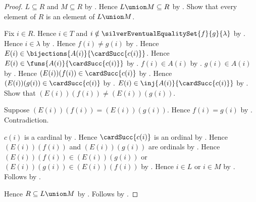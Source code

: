 \begin{proof}
    $L\subseteq R$ and $M\subseteq R$
        by .
    Hence $L\union M\subseteq R$ by .
    Show that every element of $R$ is an element of $L\union M$.
    \begin{subproof}
        Fix $i\in R$.
        Hence $i\in T$ and
            $i\notin\silverEventualEqualitySet{f}{g}{\lambda}$
            by .
        Hence $i\in\lambda$ by .
        Hence $f(i)\neq g(i)$
            by .
        Hence $E(i)\in\bijections{A(i)}{\cardSucc{c(i)}}$.
        Hence $E(i)\in\funs{A(i)}{\cardSucc{c(i)}}$
            by .
        $f(i)\in A(i)$ by .
        $g(i)\in A(i)$ by .
        Hence $(E(i))(f(i))\in\cardSucc{c(i)}$
            by .
        Hence $(E(i))(g(i))\in\cardSucc{c(i)}$
            by .
        $E(i)\in\inj{A(i)}{\cardSucc{c(i)}}$ by
            .
        Show that $(E(i))(f(i))\neq(E(i))(g(i))$.
        \begin{subproof}
            Suppose $(E(i))(f(i))=(E(i))(g(i))$.
            Hence $f(i)=g(i)$ by .
            Contradiction.
        \end{subproof}
        $c(i)$ is a cardinal by .
        Hence $\cardSucc{c(i)}$ is an ordinal
            by .
        Hence $(E(i))(f(i))$ and $(E(i))(g(i))$ are ordinals
            by .
        Hence $(E(i))(f(i))\in(E(i))(g(i))$ or
            $(E(i))(g(i))\in(E(i))(f(i))$
            by .
        Hence $i\in L$ or $i\in M$ by .
        Follows by .
    \end{subproof}
    Hence $R\subseteq L\union M$ by .
    Follows by .
\end{proof}


